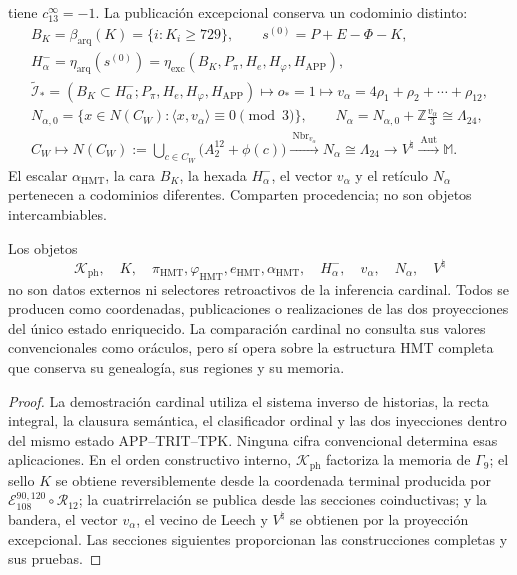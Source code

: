 tiene \(c_{13}^{\infty}=-1\).
La publicación excepcional conserva un codominio distinto:
\[
 \begin{gathered}
 B_K=\beta_{\mathrm{arq}}(K)=\{i:K_i\ge729\},\qquad
 s^{(0)}=P+E-\Phi-K,\\
 H^-_\alpha=\eta_{\mathrm{arq}}(s^{(0)})
 =\eta_{\mathrm{exc}}(B_K,P_\pi,H_e,H_\varphi,H_{\mathrm{APP}}),\\
 \widetilde{\mathcal I}_*
 =(B_K\subset H^-_\alpha;P_\pi,H_e,H_\varphi,H_{\mathrm{APP}})
 \longmapsto o_*=1
 \longmapsto v_\alpha=4\rho_1+\rho_2+\cdots+\rho_{12},\\
 N_{\alpha,0}
 =\{x\in N(C_W):\langle x,v_\alpha\rangle\equiv0\pmod3\},\qquad
 N_\alpha=N_{\alpha,0}+\mathbb Z\frac{v_\alpha}{3}\cong\Lambda_{24},\\
 C_W\longmapsto
 N(C_W):=\bigcup_{c\in C_W}\bigl(A_2^{12}+\phi(c)\bigr)
 \xrightarrow{\ \operatorname{Nbr}_{v_\alpha}\ }
 N_\alpha\cong\Lambda_{24}
 \longrightarrow V^\natural
 \xrightarrow{\ \operatorname{Aut}\ }\mathbb M.
 \end{gathered}
\]
El escalar \(\alpha_{\mathrm{HMT}}\), la cara \(B_K\), la hexada
\(H^-_\alpha\), el vector \(v_\alpha\) y el retículo \(N_\alpha\) pertenecen
a codominios diferentes. Comparten procedencia; no son objetos intercambiables.

\begin{proposition}
\label{ix:prop:posterioridad-testigos-ch}
Los objetos
\[
 \mathcal K_{\mathrm{ph}},\quad K,\quad
 \pi_{\mathrm{HMT}},\varphi_{\mathrm{HMT}},e_{\mathrm{HMT}},
 \alpha_{\mathrm{HMT}},\quad H^-_\alpha,\quad v_\alpha,\quad
 N_\alpha,\quad V^\natural
\]
no son datos externos ni selectores retroactivos de la inferencia cardinal.
Todos se producen como coordenadas, publicaciones o realizaciones de las dos
proyecciones del único estado enriquecido. La comparación cardinal no consulta
sus valores convencionales como oráculos, pero sí opera sobre la estructura
HMT completa que conserva su genealogía, sus regiones y su memoria.
\end{proposition}

\begin{proof}
La demostración cardinal utiliza el sistema inverso de historias, la recta
integral, la clausura semántica, el clasificador ordinal y las dos inyecciones
dentro del mismo estado APP--TRIT--TPK. Ninguna cifra convencional determina
esas aplicaciones. En el orden constructivo interno,
\(\mathcal K_{\mathrm{ph}}\) factoriza la memoria de \(\Gamma_9\); el sello
\(K\) se obtiene reversiblemente desde la coordenada terminal producida por
\(\mathcal E_{108}^{90,120}\circ\mathcal R_{12}\); la
cuatrirrelación se publica desde las secciones coinductivas; y la bandera, el
vector \(v_\alpha\), el vecino de Leech y \(V^\natural\) se obtienen por la
proyección excepcional. Las secciones siguientes proporcionan las
construcciones completas y sus pruebas.
\end{proof}

